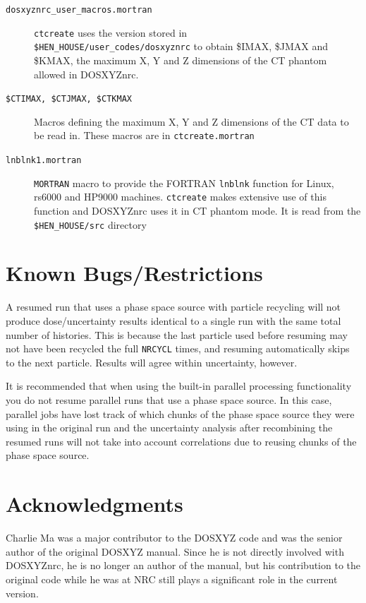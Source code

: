 \documentclass[12pt,twoside]{article}      %
\begin{document}
\begin{description}
\item[{\tt dosxyznrc\_user\_macros.mortran}]
{\tt ctcreate} uses the version stored in\\
{\tt \$HEN\_HOUSE/user\_codes/dosxyznrc}
to obtain {\$IMAX}, {\$JMAX} and {\$KMAX},
the maximum X, Y and Z dimensions of the CT phantom allowed in DOSXYZnrc.

\item[{\tt \$CTIMAX, \$CTJMAX, \$CTKMAX }]
Macros defining the maximum X, Y and Z dimensions of the CT data to be read in.
These macros are in {\tt ctcreate.mortran}

\item[{\tt lnblnk1.mortran}] {\tt MORTRAN} macro to provide the
FORTRAN {\tt lnblnk} function for Linux, rs6000 and HP9000 machines.
{\tt ctcreate} makes extensive use of this function and DOSXYZnrc uses it
in CT phantom mode.  It
is read from the {\tt \$HEN\_HOUSE/src} directory
\end{description}

\section{Known Bugs/Restrictions}

A resumed run that uses a phase space source with particle recycling will
not produce dose/uncertainty results identical to a single run with
the same total number of histories.  This is because the last particle
used before resuming may not have been recycled the full
{\tt NRCYCL} times, and resuming automatically skips to the next particle.
Results will agree within uncertainty, however.

It is recommended that when using the built-in parallel processing
functionality you do not resume parallel runs that use
a phase space source.  In this case, parallel jobs have lost track
of which chunks of the phase space source they were using in the
original run and the uncertainty analysis after recombining the
resumed runs will not take into account correlations due to reusing
chunks of the phase space source.

\section{Acknowledgments}

Charlie Ma was a major contributor to the DOSXYZ code and was the senior
author of the original DOSXYZ manual. Since he is not directly involved
with DOSXYZnrc, he is no longer an author of the manual, but his
contribution to the original code while he was at NRC still plays a
significant role in the current version.
\end{document}
